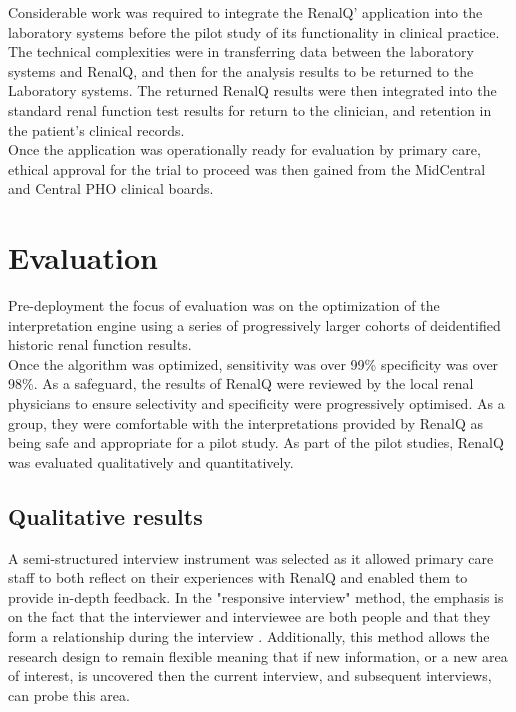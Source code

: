 \documentclass[11pt,a4paper]{article}
\begin{document}
Considerable work was required to integrate the RenalQ' application into the laboratory systems before the pilot study of its functionality in clinical practice.  The technical complexities were in transferring data between the laboratory systems and RenalQ,  and then for the analysis results to be returned to the Laboratory systems.  The returned RenalQ results were then integrated into the standard renal function test results for return to the clinician, and retention in the patient's clinical records. \\

Once the application was operationally ready for evaluation by primary care, ethical approval for the trial to proceed was then gained from the MidCentral and Central PHO clinical boards. \\

\section{Evaluation}
Pre-deployment the focus of evaluation was on the optimization of the interpretation engine using a series of progressively larger cohorts of deidentified historic renal function results. \\

Once the algorithm was optimized, sensitivity was over 99\% specificity was over 98\%.  As a safeguard, the results of RenalQ were reviewed by the local renal physicians to ensure selectivity and specificity were progressively optimised. As a group, they were comfortable with the interpretations provided by RenalQ as being safe and appropriate for a pilot study. As part of the pilot studies, RenalQ was evaluated qualitatively and quantitatively. \\

\subsection{Qualitative results}
A semi-structured interview instrument was selected as it allowed primary care staff to both reflect on their experiences with RenalQ and enabled them to provide in-depth feedback. In the "responsive interview" method, the emphasis is on the fact that the interviewer and interviewee are both people and that they form a relationship during the interview \citep{rubin2011qualitative}. Additionally, this method allows the research design to remain flexible meaning that if new information, or a new area of interest, is uncovered then the current interview, and subsequent interviews, can probe this area. \\
\end{document}
